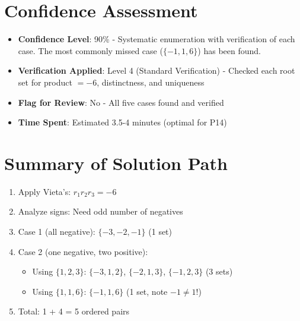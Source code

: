 \documentclass[12pt]{article}
\begin{document}
\section*{Confidence Assessment}
\begin{itemize}[leftmargin=*]
    \item \textbf{Confidence Level}: 90\% - Systematic enumeration with verification of each case. The most commonly missed case ($\{-1, 1, 6\}$) has been found.
    \item \textbf{Verification Applied}: Level 4 (Standard Verification) - Checked each root set for product $= -6$, distinctness, and uniqueness
    \item \textbf{Flag for Review}: No - All five cases found and verified
    \item \textbf{Time Spent}: Estimated 3.5-4 minutes (optimal for P14)
\end{itemize}

\section*{Summary of Solution Path}

\begin{enumerate}
    \item Apply Vieta's: $r_1 r_2 r_3 = -6$
    \item Analyze signs: Need odd number of negatives
    \item Case 1 (all negative): $\{-3, -2, -1\}$ (1 set)
    \item Case 2 (one negative, two positive):
    \begin{itemize}
        \item Using $\{1, 2, 3\}$: $\{-3, 1, 2\}$, $\{-2, 1, 3\}$, $\{-1, 2, 3\}$ (3 sets)
        \item Using $\{1, 1, 6\}$: $\{-1, 1, 6\}$ (1 set, note $-1 \neq 1$!)
    \end{itemize}
    \item Total: 1 + 4 = 5 ordered pairs
\end{enumerate}
\end{document}
